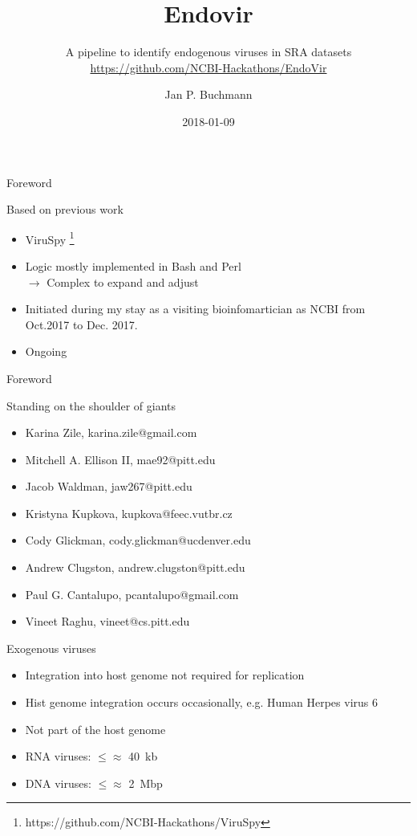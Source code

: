 \documentclass{beamer}
\title[]{Endovir}
\subtitle{A pipeline to identify endogenous viruses in SRA datasets\\[1em]
          \small{\url{https://github.com/NCBI-Hackathons/EndoVir}}}
\author[]{Jan P. Buchmann}
\institute{NCBI, NLM, NIH, Bethesda, MD, USA \\
           The University of Sydney, Sydney, Australia}
\date{2018-01-09}
\begin{document}
  \titlepage

  \begin{frame}{Foreword}
    \begin{block}{Based on previous work}
      \begin{itemize}
        \item ViruSpy \footnote{https://github.com/NCBI-Hackathons/ViruSpy}
        \item Logic  mostly implemented in Bash and Perl \\
              $\rightarrow$ Complex to expand and adjust
        \item Initiated during my stay as a visiting bioinfomartician as NCBI
              from Oct.2017 to Dec. 2017.
        \item Ongoing
      \end{itemize}
    \end{block}
  \end{frame}



  \begin{frame}{Foreword}
    \begin{block}{Standing on the shoulder of giants}
      \begin{itemize}
        \item Karina Zile, karina.zile@gmail.com
        \item Mitchell A. Ellison II, mae92@pitt.edu
        \item Jacob Waldman, jaw267@pitt.edu
        \item Kristyna Kupkova, kupkova@feec.vutbr.cz
        \item Cody Glickman, cody.glickman@ucdenver.edu
        \item Andrew Clugston, andrew.clugston@pitt.edu
        \item Paul G. Cantalupo, pcantalupo@gmail.com
        \item Vineet Raghu, vineet@cs.pitt.edu
      \end{itemize}
    \end{block}
  \end{frame}

  \begin{frame}{Exogenous viruses}
    \begin{itemize}
      \item Integration into host genome not required for replication
      \item Hist genome integration occurs occasionally, e.g. Human Herpes virus 6
      \item Not part of the host genome
      \item RNA viruses: $\le \approx$ 40~kb
      \item DNA viruses: $\le \approx$ 2~Mbp
    \end{itemize}
    \center
    
  \end{frame}
\end{document}
